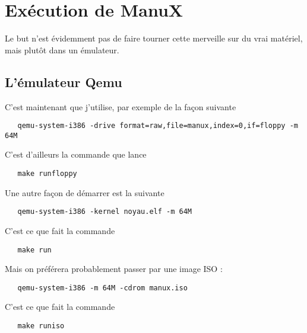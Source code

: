 %
\section{Exécution de ManuX}
\label{section:execution}

   Le but n'est évidemment pas de faire tourner cette merveille sur du
vrai matériel, mais plutôt dans un émulateur.

%
\subsection{L'émulateur Qemu}

   C'est maintenant \qemu \cite{qemu-website}  que j'utilise, par exemple de la façon
suivante
   
\begin{lstlisting}
   qemu-system-i386 -drive format=raw,file=manux,index=0,if=floppy -m 64M
\end{lstlisting}

  C'est d'ailleurs la commande que lance

\begin{lstlisting}
   make runfloppy
\end{lstlisting}

   Une autre façon de démarrer \manux est la suivante

\begin{lstlisting}
   qemu-system-i386 -kernel noyau.elf -m 64M
\end{lstlisting}

  C'est ce que fait la commande

\begin{lstlisting}
   make run
\end{lstlisting}

   Mais on préférera probablement passer par une image ISO :

\begin{lstlisting}
   qemu-system-i386 -m 64M -cdrom manux.iso
\end{lstlisting}

  C'est ce que fait la commande

\begin{lstlisting}
   make runiso
\end{lstlisting}

